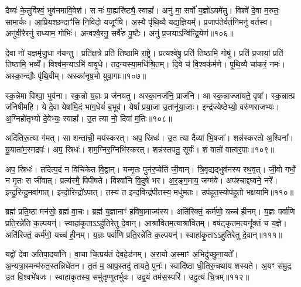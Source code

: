 दैव्यः॑ के॒तुर्विश्वं॒ भुव॑नमावि॒वेश॑।
स नः॑ पा॒ह्यरि॑ष्ट्यै॒ स्वाहा᳚।
अनु॑ मा॒ सर्वो॑ य॒ज्ञो॑\-ऽयमे॑तु।
विश्वे॑ दे॒वा म॒रुतः॒ सामा॒र्कः।
आ॒प्रिय॒श्छन्दाꣳ॑सि नि॒विदो॒ यजूꣳ॑षि।
अ॒स्यै पृ॑थि॒व्यै यद्य॒ज्ञियम्᳚।
प्र॒जा\-प॑तेर्वर्त॒निमनु॑ वर्तस्व।
अनु॑वी॒रैरनु॑\- राध्याम॒ गोभिः॑।
अन्वश्वै॒रनु॒\- सर्वै॑रु पु॒ष्टैः।
अनु॑ प्र॒जया\-ऽन्वि॑न्द्रि॒येण॑॥१०६॥\ip

दे॒वा नो॑ य॒ज्ञमृ॑जु॒धा न॑यन्तु।
प्रति॑\-क्ष॒त्रे प्रति॑ तिष्ठामि रा॒ष्ट्रे।
प्रत्यश्वे॑षु॒ प्रति॑ तिष्ठामि॒ गोषु॑।
प्रति॑ प्र॒जायां॒ प्रति॑ तिष्ठामि॒ भव्ये᳚।
विश्व॑म॒न्याऽभि॑ वावृ॒धे।
तद॒न्यस्या॒मधि॑श्रि॒तम्।
दि॒वे च॑ वि॒श्वक॑र्मणे।
पृ॒थि॒व्यै चा॑करं॒ नमः॑।
अस्का॒न्द्यौः पृ॑थि॒वीम्।
अस्का॑नृष॒भो युवा॒गाः॥१०७॥\ip

स्क॒न्नेमा विश्वा॒ भुव॑ना।
स्क॒न्नो य॒ज्ञः प्र ज॑नयतु।
अस्का॒नज॑नि॒ प्राज॑नि।
आ स्क॒न्नाज्जा॑यते॒ वृषा᳚।
स्क॒न्नात्प्र ज॑निषीमहि।
ये दे॒वा येषा॑मि॒दं भा॑ग॒धेयं॑ ब॒भूव॑।
येषां᳚ प्रया॒जा उ॒तानू॑या॒जाः।
इन्द्र॑ज्येष्ठेभ्यो॒ वरु॑णराजभ्यः।
अ॒ग्निहो॑तृभ्यो दे॒वेभ्यः॒ स्वाहा᳚।
उ॒त त्या नो॒ दिवा॑ म॒तिः॥१०८॥\ip

अदि॑तिरू॒त्या ग॑मत्।
सा शन्ता॑ची॒ मय॑स्करत्।
अप॒ स्रिधः॑।
उ॒त त्या दैव्या॑ भि॒षजा᳚।
शन्न॑स्करतो अ॒श्विना᳚।
यू॒याता॑म॒स्मद्रपः॑।
अप॒ स्रिधः॑।
शम॒ग्निर॒ग्निभि॑स्करत्।
शन्न॑स्तपतु॒ सूर्यः॑।
शं वातो॑ वात्वर॒पाः॥१०९॥\ip

अप॒ स्रिधः॑।
तदित्प॒दं न विचि॑केत वि॒द्वान्।
यन्मृ॒तः पुन॑र॒प्येति॑ जी॒वान्।
त्रि॒वृद्यद्भुव॑नस्य रथ॒वृत्।
जी॒वो गर्भो॒ न मृ॒तः स जी॑वात्।
प्रत्य॑स्मै॒ पिपी॑षते।
विश्वा॑नि वि॒दुषे॑ भर।
अ॒र॒ङ्ग॒माय॒ जग्म॑वे।
अप॑श्चाद्दघ्वने॒ नरे᳚।
इन्दु॒रिन्दु॒मवा॑गात्।
इन्दो॒रिन्द्रो॑\-ऽपात्।
तस्य॑ त इन्द॒विन्द्र॑पीतस्य॒ मधु॑मतः।
उप॑हूत॒स्योप॑हूतो भक्षयामि॥११०॥\ip\anuvakamend[उ॒द॒र्॒ष इ॑न्द्रि॒येण॒ गा म॒तिर॑र॒पा अ॑गा॒त्रीणि॑ च]

ब्रह्म॑ प्रति॒ष्ठा मन॑सो॒ ब्रह्म॑ वा॒चः।
ब्रह्म॑ य॒ज्ञानाꣳ॑ ह॒विषा॒माज्य॑स्य।
अति॑रिक्तं॒ कर्म॑णो॒ यच्च॑ ही॒नम्।
य॒ज्ञः पर्वा॑णि प्रति॒रन्ने॑ति क॒ल्पयन्॑।
स्वाहा॑कृ॒ता\-ऽऽहु॑तिरेतु दे॒वान्।
आश्रा॑वितम॒त्याश्रा॑वितम्।
वष॑ट्कृतम॒त्यनू᳚क्तं च य॒ज्ञे।
अति॑रिक्तं॒ कर्म॑णो॒ यच्च॑ ही॒नम्।
य॒ज्ञः पर्वा॑णि प्रति॒रन्ने॑ति क॒ल्पयन्॑।
स्वाहा॑कृ॒ता\-ऽऽहु॑तिरेतु दे॒वान्॥१११॥\ip

यद्वो॑ देवा अतिपा॒दया॑नि।
वा॒चा चि॒त्प्रय॑तं देव॒हेड॑नम्।
अ॒रा॒यो अ॒स्माꣳ अ॒भिदु॑च्छुना॒यते᳚।
अ॒न्यत्रा॒स्मन्म॑रुत॒स्तन्निधे॑\-तन।
त॒तं म॒ आप॒स्तदु॑ तायते॒ पुनः॑।
स्वादि॑ष्ठा धी॒तिरु॒चथा॑य शस्यते।
अ॒यꣳ स॑मु॒द्र उ॒त वि॒श्वभे॑षजः।
स्वाहा॑कृतस्य॒ समु॑तृप्णुतर्भुवः।
उद्व॒यं तम॑स॒स्परि॑।
उदु॒त्यं चि॒त्रम्॥११२॥\ip

